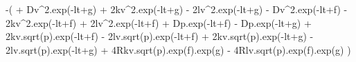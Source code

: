 -(
    + Dv^2.exp(-lt+g) 
    + 2kv^2.exp(-lt+g) 
    - 2lv^2.exp(-lt+g) 
    - Dv^2.exp(-lt+f) 
    - 2kv^2.exp(-lt+f) 
    + 2lv^2.exp(-lt+f) 
    + Dp.exp(-lt+f) 
    - Dp.exp(-lt+g) 
    + 2kv.sqrt(p).exp(-lt+f) 
    - 2lv.sqrt(p).exp(-lt+f) 
    + 2kv.sqrt(p).exp(-lt+g) 
    - 2lv.sqrt(p).exp(-lt+g) 
    + 4Rkv.sqrt(p).exp(f).exp(g)
    - 4Rlv.sqrt(p).exp(f).exp(g)
)